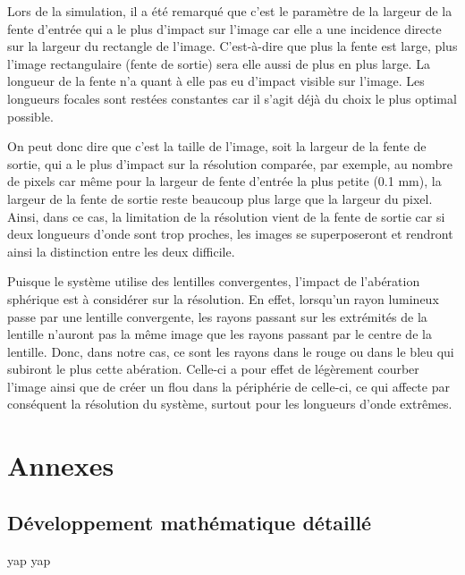 \documentclass[conference]{IEEEtran}
\begin{document}
Lors de la simulation, il a été remarqué que c'est le paramètre de la largeur de la fente d'entrée qui a le plus d'impact sur l'image
car elle a une incidence directe sur la largeur du rectangle de l'image. C'est-à-dire que plus la fente est large, plus
l'image rectangulaire (fente de sortie) sera elle aussi de plus en plus large. La longueur de la fente n'a quant à elle pas eu d'impact
visible sur l'image. Les longueurs focales sont restées constantes car il s'agit déjà du choix le plus optimal possible.

On peut donc dire que c'est la taille de l'image, soit la largeur de la fente de sortie, qui a le plus d'impact sur la résolution comparée, par exemple, au nombre de pixels
car même pour la largeur de fente d'entrée la plus petite (0.1 mm), la largeur de la fente de sortie reste beaucoup plus large que la largeur du pixel.
Ainsi, dans ce cas, la limitation de la résolution vient de la fente de sortie car si deux longueurs d'onde sont trop proches, les images se superposeront
et rendront ainsi la distinction entre les deux difficile.

Puisque le système utilise des lentilles convergentes, l'impact de l'abération sphérique est à considérer sur la résolution.
En effet, lorsqu'un rayon lumineux passe par une lentille convergente, les rayons passant sur les extrémités de la lentille
n'auront pas la même image que les rayons passant par le centre de la lentille. Donc, dans notre cas, ce sont les
rayons dans le rouge ou dans le bleu qui subiront le plus cette abération. Celle-ci a pour effet de légèrement courber l'image
ainsi que de créer un flou dans la périphérie de celle-ci, ce qui affecte par conséquent la résolution du système, surtout pour les longueurs d'onde
extrêmes.

\section{Annexes}

\subsection{Développement mathématique détaillé}
yap yap


\clearpage

% 
% 
\end{document}
